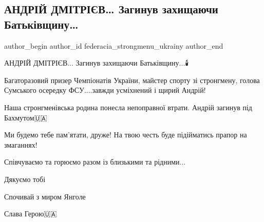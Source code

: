  
 
 
 
 

\subsection{АНДРІЙ ДМІТРІЄВ… Загинув захищаючи Батьківщину…}
\label{sec:05_01_2023.fb.federacia_strongmenu_ukrainy.1.andr_i_dm_tr_v__zag}

\ifcmt
 author_begin
   author_id federacia_strongmenu_ukrainy
 author_end
\fi

АНДРІЙ ДМІТРІЄВ... Загинув захищаючи Батьківщину...🕯️ 

Багаторазовий призер Чемпіонатів України, майстер спорту зі стронгмену, голова
Сумського осередку ФСУ....завжди усміхнений і щирий Андрій! 

Наша стронгменівська родина понесла непоправної втрати. Андрій загинув під
Бахмутом🇺🇦

Ми будемо тебе пам'ятати, друже! На твою честь буде підійматись прапор на
змаганнях! 

Співчуваємо та горюємо разом із близькими та рідними...

Дякуємо тобі🙏

Спочивай з миром Янголе🖤 

Слава Герою🇺🇦
